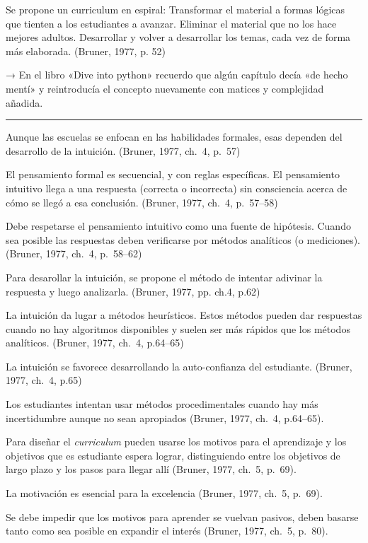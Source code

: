 \documentclass[
  12,
]{scrartcl}
\begin{document}
Se propone un curriculum en espiral: Transformar el material a formas
lógicas que tienten a los estudiantes a avanzar. Eliminar el material
que no los hace mejores adultos. Desarrollar y volver a desarrollar los
temas, cada vez de forma más elaborada. (Bruner, 1977, p. 52)

→ En el libro «Dive into python» recuerdo que algún capítulo decía «de
hecho mentí» y reintroducía el concepto nuevamente con matices y
complejidad añadida.

\begin{center}\rule{0.5\linewidth}{0.5pt}\end{center}

Aunque las escuelas se enfocan en las habilidades formales, esas
dependen del desarrollo de la intuición. (Bruner, 1977, ch.~4, p.~57)

El pensamiento formal es secuencial, y con reglas específicas. El
pensamiento intuitivo llega a una respuesta (correcta o incorrecta) sin
consciencia acerca de cómo se llegó a esa conclusión. (Bruner, 1977,
ch.~4, p.~57--58)

Debe respetarse el pensamiento intuitivo como una fuente de hipótesis.
Cuando sea posible las respuestas deben verificarse por métodos
analíticos (o mediciones). (Bruner, 1977, ch.~4, p.~58--62)

Para desarollar la intuición, se propone el método de intentar adivinar
la respuesta y luego analizarla. (Bruner, 1977, pp. ch.4, p.62)

La intuición da lugar a métodos heurísticos. Estos métodos pueden dar
respuestas cuando no hay algoritmos disponibles y suelen ser más rápidos
que los métodos analíticos. (Bruner, 1977, ch.~4, p.64--65)

La intuición se favorece desarrollando la auto-confianza del estudiante.
(Bruner, 1977, ch.~4, p.65)

Los estudiantes intentan usar métodos procedimentales cuando hay más
incertidumbre aunque no sean apropiados (Bruner, 1977, ch.~4, p.64--65).

Para diseñar el \emph{curriculum} pueden usarse los motivos para el
aprendizaje y los objetivos que es estudiante espera lograr,
distinguiendo entre los objetivos de largo plazo y los pasos para llegar
allí (Bruner, 1977, ch.~5, p.~69).

La motivación es esencial para la excelencia (Bruner, 1977, ch.~5,
p.~69).

Se debe impedir que los motivos para aprender se vuelvan pasivos, deben
basarse tanto como sea posible en expandir el interés (Bruner, 1977,
ch.~5, p.~80).
\end{document}
